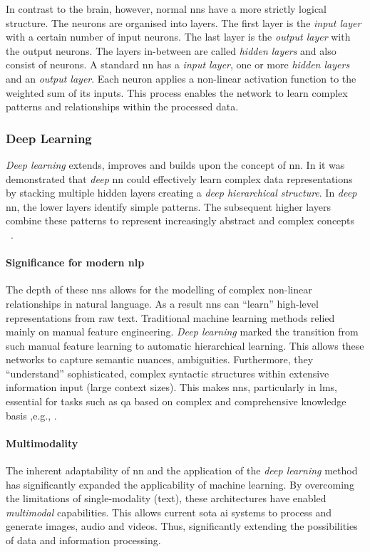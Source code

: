 In contrast to the brain, however, normal \acp{nn} have a more strictly logical structure.
The neurons are organised into layers.
The first layer is the \textit{input layer} with a certain number of input neurons.
The last layer is the \textit{output layer} with the output neurons.
The layers in-between are called \textit{hidden layers} and also consist of neurons.
A standard \ac{nn} has a \textit{input layer}, one or more \textit{hidden layers} and an \textit{output layer}.
Each neuron applies a non-linear activation function to the weighted sum of its inputs. This process enables the network to learn complex patterns and relationships within the processed data.
%
\subsubsection{Deep Learning}

\textit{Deep learning} extends, improves and builds upon the concept of \ac{nn}.
In \citet{hinton2006fast} it was demonstrated that \textit{deep} \ac{nn} could effectively learn complex data representations by stacking multiple hidden layers creating a \textit{deep hierarchical structure}.
In \textit{deep} \ac{nn}, the lower layers identify simple patterns.
The subsequent higher layers combine these patterns to represent increasingly abstract and complex concepts ~\citep[p.~436]{lecun2015deep}.

\paragraph{Significance for modern \ac{nlp}}
%
The depth of these \acp{nn} allows for the modelling of complex non-linear relationships in natural language.
As a result \acp{nn} can \enquote{learn} high-level representations from raw text.
Traditional machine learning methods relied mainly on manual feature engineering.
\textit{Deep learning} marked the transition from such manual feature learning to automatic hierarchical learning.
This allows these networks to capture semantic nuances, ambiguities.
Furthermore, they \enquote{understand} sophisticated, complex syntactic structures within extensive information input (large context sizes).
This makes \acp{nn}, particularly in \acp{lm}, essential for tasks such as \ac{qa} based on complex and comprehensive knowledge basis ,e.g., .
%
\paragraph{Multimodality}
%
The inherent adaptability of \ac{nn} and the application of the \textit{deep learning} method has significantly expanded the applicability of machine learning.
By overcoming the limitations of single-modality (text), these architectures have enabled \textit{multimodal} capabilities.
This allows current \ac{sota} \ac{ai} systems to process and generate images, audio and videos.
Thus, significantly extending the possibilities of data and information processing.
%
